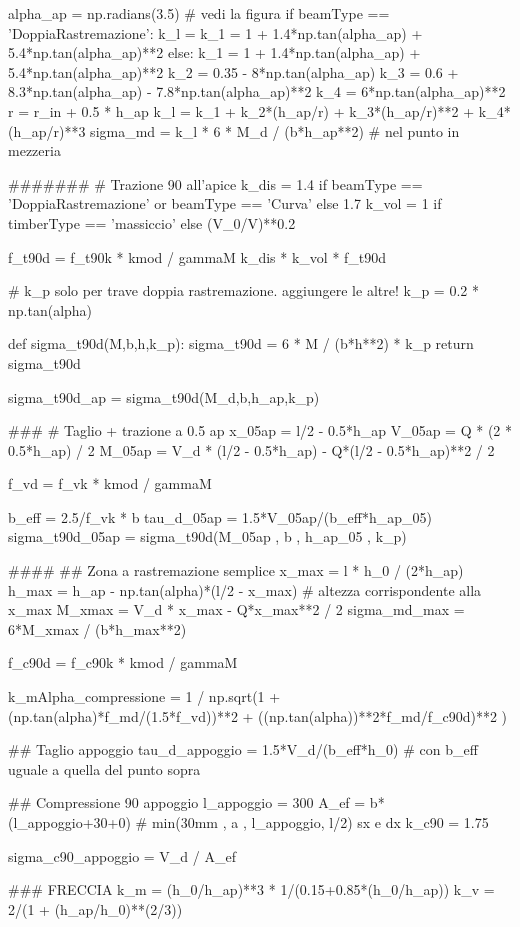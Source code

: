 \begin{pycode}[TraveDoppiaRastremazione]
alpha_ap = np.radians(3.5) # vedi la figura
if beamType == 'DoppiaRastremazione':
    k_l = k_1 = 1 + 1.4*np.tan(alpha_ap) + 5.4*np.tan(alpha_ap)**2
else:
    k_1 = 1 + 1.4*np.tan(alpha_ap) + 5.4*np.tan(alpha_ap)**2
    k_2 = 0.35 - 8*np.tan(alpha_ap)
    k_3 = 0.6 + 8.3*np.tan(alpha_ap) - 7.8*np.tan(alpha_ap)**2
    k_4 = 6*np.tan(alpha_ap)**2
    r = r_in + 0.5 * h_ap
    k_l = k_1 + k_2*(h_ap/r) + k_3*(h_ap/r)**2 + k_4*(h_ap/r)**3
sigma_md = k_l * 6 * M_d / (b*h_ap**2) # nel punto in mezzeria

#######
# Trazione 90 all'apice
k_dis =  1.4 if beamType == 'DoppiaRastremazione' or  beamType == 'Curva' else  1.7
k_vol = 1 if timberType == 'massiccio' else (V_0/V)**0.2 

f_t90d = f_t90k * kmod / gammaM
k_dis * k_vol * f_t90d

# k_p solo per trave doppia rastremazione. aggiungere le altre!
k_p = 0.2 * np.tan(alpha) 

def sigma_t90d(M,b,h,k_p):
    sigma_t90d = 6 * M / (b*h**2) * k_p
    return sigma_t90d

sigma_t90d_ap = sigma_t90d(M_d,b,h_ap,k_p)

###
# Taglio + trazione a 0.5 ap
x_05ap = l/2 - 0.5*h_ap
V_05ap = Q * (2 * 0.5*h_ap) / 2
M_05ap = V_d * (l/2 - 0.5*h_ap) - Q*(l/2 - 0.5*h_ap)**2 / 2

f_vd = f_vk * kmod / gammaM

b_eff = 2.5/f_vk * b
tau_d_05ap = 1.5*V_05ap/(b_eff*h_ap_05)
sigma_t90d_05ap = sigma_t90d(M_05ap , b , h_ap_05 , k_p)

####
## Zona a rastremazione semplice
x_max = l * h_0 / (2*h_ap)
h_max = h_ap - np.tan(alpha)*(l/2 - x_max) # altezza corrispondente alla x_max
M_xmax = V_d * x_max - Q*x_max**2 / 2
sigma_md_max = 6*M_xmax / (b*h_max**2)

f_c90d = f_c90k * kmod / gammaM

k_mAlpha_compressione = 1 / np.sqrt(1 + (np.tan(alpha)*f_md/(1.5*f_vd))**2 + ((np.tan(alpha))**2*f_md/f_c90d)**2 )

## Taglio appoggio
tau_d_appoggio = 1.5*V_d/(b_eff*h_0)
# con b_eff uguale a quella del punto sopra

## Compressione 90 appoggio
l_appoggio = 300
A_ef = b* (l_appoggio+30+0) # min(30mm , a , l_appoggio, l/2) sx e dx
k_c90 = 1.75

sigma_c90_appoggio = V_d / A_ef

### FRECCIA
k_m = (h_0/h_ap)**3 * 1/(0.15+0.85*(h_0/h_ap))
k_v = 2/(1 + (h_ap/h_0)**(2/3))


\end{pycode}
